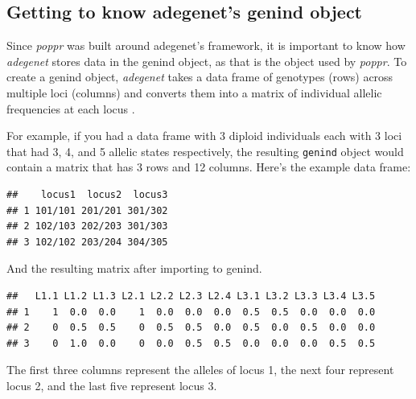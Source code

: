 \documentclass[letterpaper]{article}\usepackage[]{graphicx}\usepackage[]{color}
\makeatletter
\newenvironment{kframe}{%
 \def\at@end@of@kframe{}%
 \ifinner\ifhmode%
  \def\at@end@of@kframe{\end{minipage}}%
  \begin{minipage}{\columnwidth}%
 \fi\fi%
 \def\FrameCommand##1{\hskip\@totalleftmargin \hskip-\fboxsep
 \colorbox{shadecolor}{##1}\hskip-\fboxsep
     \hskip-\linewidth \hskip-\@totalleftmargin \hskip\columnwidth}%
 \MakeFramed {\advance\hsize-\width
   \@totalleftmargin\z@ \linewidth\hsize
   \@setminipage}}%
 {\par\unskip\endMakeFramed%
 \at@end@of@kframe}
\newenvironment{knitrout}{}{} %
\newcommand{\tab}{\hspace*{1em}}
\makeatother
\begin{document}
\subsection{Getting to know adegenet's genind object}\label{intro:genind}

\tab\tab Since \textit{poppr} was built around adegenet's framework, it is important to know how \textit{adegenet} stores data in the genind object, as that is the object used by \textit{poppr}. To create a genind object, \textit{adegenet} takes a data frame of genotypes (rows) across multiple loci (columns) and converts them into a matrix of individual allelic frequencies at each locus \cite{Jombart:2008}.

For example, if you had a data frame with 3 diploid individuals each with 3 loci that had 3, 4, and 5 allelic states respectively, the resulting \texttt{genind} object would contain a matrix that has 3 rows and 12 columns. 
\noindent Here's the example data frame:
\begin{knitrout}\footnotesize
{}\color{fgcolor}\begin{kframe}
\begin{verbatim}
##    locus1  locus2  locus3
## 1 101/101 201/201 301/302
## 2 102/103 202/203 301/303
## 3 102/102 203/204 304/305
\end{verbatim}
\end{kframe}
\end{knitrout}

And the resulting matrix after importing to genind.
\begin{knitrout}\footnotesize
{}\color{fgcolor}\begin{kframe}
\begin{verbatim}
##   L1.1 L1.2 L1.3 L2.1 L2.2 L2.3 L2.4 L3.1 L3.2 L3.3 L3.4 L3.5
## 1    1  0.0  0.0    1  0.0  0.0  0.0  0.5  0.5  0.0  0.0  0.0
## 2    0  0.5  0.5    0  0.5  0.5  0.0  0.5  0.0  0.5  0.0  0.0
## 3    0  1.0  0.0    0  0.0  0.5  0.5  0.0  0.0  0.0  0.5  0.5
\end{verbatim}
\end{kframe}
\end{knitrout}

The first three columns represent the alleles of locus 1, the next four represent locus 2, and the last five represent locus 3.
\end{document}
